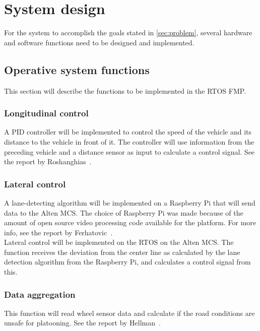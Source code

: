 \chapter{System design}
\label{sec:system_design}
For the system to accomplish the goals stated in \ref{sec:problem}, several hardware and software functions need to be designed and implemented.\\


\section{Operative system functions}
This section will describe the functions to be implemented in the RTOS FMP.

\subsection{Longitudinal control}
A PID controller will be implemented to control the speed of the vehicle and its distance to the vehicle in front of it. The controller will use information from the preceding vehicle and a distance sensor as input to calculate a control signal. See the report by Roshanghias~\cite{roshanghias2017}.

\subsection{Lateral control}
A lane-detecting algorithm will be implemented on a Raspberry Pi that will send data to the Alten MCS. The choice of Raspberry Pi was made because of the amount of open source video processing code available for the platform. For more info, see the report by Ferhatovic~\cite{ferhatovic2017}.\\

Lateral control will be implemented on the RTOS on the Alten MCS. The function receives the deviation from the center line as calculated by the lane detection algorithm from the Raspberry Pi, and calculates a control signal from this.

\subsection{Data aggregation}
This function will read wheel sensor data and calculate if the road conditions are unsafe for platooning. See the report by Hellman~\cite{hellman2017}.

